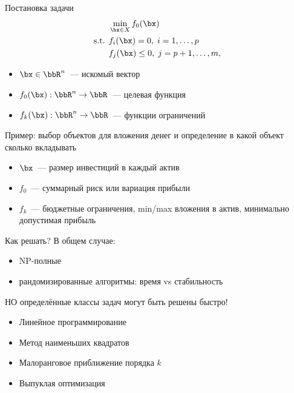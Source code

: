 \documentclass[12pt]{beamer}
\begin{document}
\begin{frame}{Постановка задачи}
\begin{equation*}
\begin{split}
&\min\limits_{\bx \in X} f_0(\bx)\\
\text{s.t. } & f_i(\bx) = 0, \; i = 1,\ldots,p\\
& f_j(\bx) \leq 0, \; j = p+1,\ldots,m,
\end{split}
\end{equation*}
\begin{itemize}
\item $\bx \in \bbR^n$~--- искомый вектор
\item $f_0(\bx): \bbR^n \rightarrow \bbR$~--- целевая функция
\item $f_k(\bx): \bbR^n \rightarrow \bbR$~--- функции ограничений
\end{itemize}
Пример: выбор объектов для вложения денег и определение в какой объект сколько вкладывать
\begin{itemize}
\item $\bx$~--- размер инвестиций в каждый актив
\item $f_0$~--- суммарный риск или вариация прибыли
\item $f_k$~--- бюджетные ограничения, min/max вложения в актив, минимально допустимая прибыль
\end{itemize}

\end{frame}

\begin{frame}{Как решать?}
В общем случае:
\begin{itemize}
\item NP-полные
\item {\small рандомизированные алгоритмы: время vs стабильность}
\end{itemize}

{\small НО определённые классы задач могут быть решены быстро!}

\begin{itemize}
\item Линейное программирование
\item Метод наименьших квадратов
\item Малоранговое приближение порядка $k$
\item Выпуклая оптимизация
\end{itemize}
\end{frame}
\end{document}

